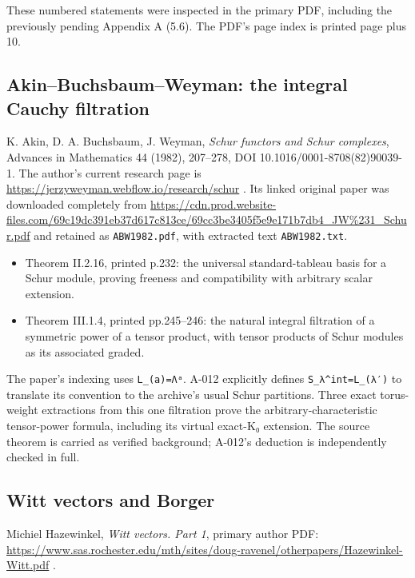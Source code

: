 \documentclass[
  10pt,
]{article}
\providecommand{\tightlist}{%
  \setlength{\itemsep}{0pt}\setlength{\parskip}{0pt}}
\providecommand{\tightlist}{\setlength{\itemsep}{0pt}\setlength{\parskip}{0pt}}
\begin{document}
These numbered statements were inspected in the primary PDF, including
the previously pending Appendix A (5.6). The PDF's page index is printed
page plus 10.

\subsection{Akin--Buchsbaum--Weyman: the integral Cauchy
filtration}\label{akinbuchsbaumweyman-the-integral-cauchy-filtration}

K. Akin, D. A. Buchsbaum, J. Weyman, \emph{Schur functors and Schur
complexes}, Advances in Mathematics 44 (1982), 207--278, DOI
10.1016/0001-8708(82)90039-1. The author's current research page is
\url{https://jerzyweyman.webflow.io/research/schur} . Its linked
original paper was downloaded completely from
\url{https://cdn.prod.website-files.com/69c19dc391eb37d617c813ce/69cc3be3405f5e9e171b7db4_JW\%231_Schur.pdf}
and retained as \texttt{\small ABW1982.pdf}, with extracted text
\texttt{\small ABW1982.txt}.

\begin{itemize}
\tightlist
\item
  Theorem II.2.16, printed p.232: the universal standard-tableau basis
  for a Schur module, proving freeness and compatibility with arbitrary
  scalar extension.
\item
  Theorem III.1.4, printed pp.245--246: the natural integral filtration
  of a symmetric power of a tensor product, with tensor products of
  Schur modules as its associated graded.
\end{itemize}

The paper's indexing uses
\texttt{\small L\_\allowbreak{}(\allowbreak{}a)\allowbreak{}=\allowbreak{}Λᵃ}.
A-012 explicitly defines
\texttt{\small S\_\allowbreak{}λ\textasciicircum{}int=\allowbreak{}L\_\allowbreak{}(\allowbreak{}λ′)\allowbreak{}}
to translate its convention to the archive's usual Schur partitions.
Three exact torus-weight extractions from this one filtration prove the
arbitrary-characteristic tensor-power formula, including its virtual
exact-K₀ extension. The source theorem is carried as verified
background; A-012's deduction is independently checked in full.

\subsection{Witt vectors and Borger}\label{witt-vectors-and-borger}

Michiel Hazewinkel, \emph{Witt vectors. Part 1}, primary author PDF:
\url{https://www.sas.rochester.edu/mth/sites/doug-ravenel/otherpapers/Hazewinkel-Witt.pdf}
.
\end{document}

